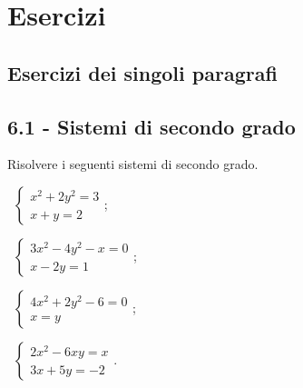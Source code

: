 \section{Esercizi}
\subsection{Esercizi dei singoli paragrafi}
\subsection*{6.1 - Sistemi di secondo grado}

\begin{esercizio}[\Ast]
 \label{ese:6.1}
Risolvere i seguenti sistemi di secondo grado.
\begin{multicols}{2}
 \begin{enumeratea}
 \item~$\left\{\begin{array}{l}x^2+2y^2=3\\x+y=2\end{array}\right.$;
 \item~$\left\{\begin{array}{l}3x^2-4y^2-x=0\\x-2y=1\end{array}\right.$;
 \item~$\left\{\begin{array}{l}4x^2+2y^2-6=0\\x=y\end{array}\right.$;
 \item~$\left\{\begin{array}{l}2x^2-6xy=x\\3x+5y=-2\end{array}\right.$.
 \end{enumeratea}
 \end{multicols}
\end{esercizio}

